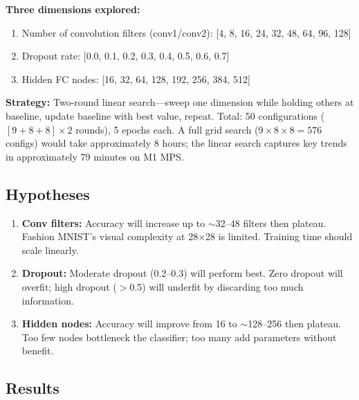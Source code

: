\documentclass[11pt]{article}
\begin{document}
\textbf{Three dimensions explored:}
\begin{enumerate}
    \item Number of convolution filters (conv1/conv2):
    [4, 8, 16, 24, 32, 48, 64, 96, 128]
    \item Dropout rate: [0.0, 0.1, 0.2, 0.3, 0.4, 0.5, 0.6, 0.7]
    \item Hidden FC nodes: [16, 32, 64, 128, 192, 256, 384, 512]
\end{enumerate}

\textbf{Strategy:} Two-round linear search---sweep one dimension while
holding others at baseline, update baseline with best value, repeat.
Total: 50 configurations ($[9{+}8{+}8] \times 2$ rounds), 5 epochs
each. A full grid search ($9 \times 8 \times 8 = 576$ configs) would
take approximately 8 hours; the linear search captures key trends in
approximately 79 minutes on M1 MPS.

\subsection{Hypotheses}

\begin{enumerate}
    \item \textbf{Conv filters:} Accuracy will increase up to
    $\sim$32--48 filters then plateau. Fashion MNIST's visual complexity
    at 28$\times$28 is limited. Training time should scale linearly.

    \item \textbf{Dropout:} Moderate dropout (0.2--0.3) will perform
    best. Zero dropout will overfit; high dropout ($>$0.5) will
    underfit by discarding too much information.

    \item \textbf{Hidden nodes:} Accuracy will improve from 16 to
    $\sim$128--256 then plateau. Too few nodes bottleneck the classifier;
    too many add parameters without benefit.
\end{enumerate}

\subsection{Results}
\end{document}
